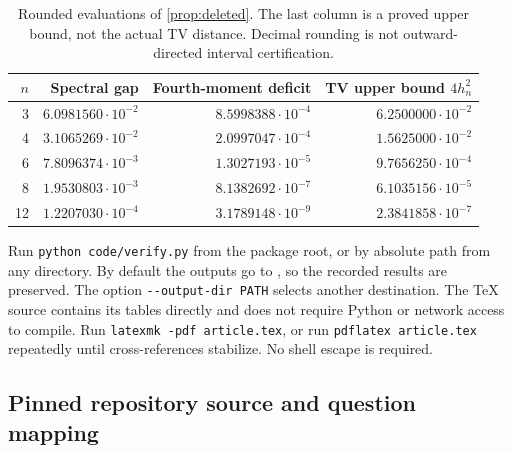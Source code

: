 \documentclass[11pt,a4paper]{article}
\numberwithin{equation}{section}
\theoremstyle{definition}
\theoremstyle{remark}
\begin{document}
\begin{table}[htbp]
\centering\small
\begin{tabular}{@{}rrrr@{}}
\toprule
$n$ & Spectral gap & Fourth-moment deficit & TV upper bound $4h_n^2$\\
\midrule
3 & $6.0981560\cdot10^{-2}$ & $8.5998388\cdot10^{-4}$ & $6.2500000\cdot10^{-2}$\\
4 & $3.1065269\cdot10^{-2}$ & $2.0997047\cdot10^{-4}$ & $1.5625000\cdot10^{-2}$\\
6 & $7.8096374\cdot10^{-3}$ & $1.3027193\cdot10^{-5}$ & $9.7656250\cdot10^{-4}$\\
8 & $1.9530803\cdot10^{-3}$ & $8.1382692\cdot10^{-7}$ & $6.1035156\cdot10^{-5}$\\
12 & $1.2207030\cdot10^{-4}$ & $3.1789148\cdot10^{-9}$ & $2.3841858\cdot10^{-7}$\\
\bottomrule
\end{tabular}
\caption{Rounded evaluations of \cref{prop:deleted}. The last column is a
proved upper bound, not the actual TV distance. Decimal rounding is not
outward-directed interval certification.}
\label{tab:witnesses}
\end{table}

Run \texttt{python code/verify.py} from the package root, or by absolute
path from any directory. By default the outputs go to ,
so the recorded results are preserved. The option
\texttt{-{}-output-dir PATH} selects another destination. The TeX source
contains its tables directly and does not require Python or network access
to compile. Run \texttt{latexmk -pdf article.tex}, or run
\texttt{pdflatex article.tex} repeatedly until cross-references stabilize.
No shell escape is required.

\subsection{Pinned repository source and question mapping}
\end{document}
